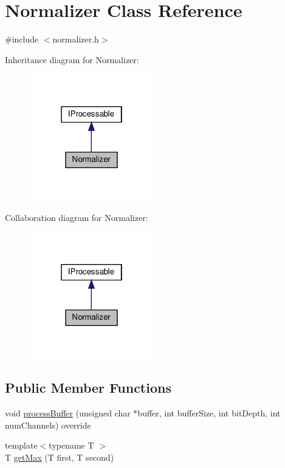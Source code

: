 \hypertarget{classNormalizer}{}\section{Normalizer Class Reference}
\label{classNormalizer}


{\ttfamily \#include $<$normalizer.\+h$>$}



Inheritance diagram for Normalizer\+:
\nopagebreak
\begin{figure}[H]
\begin{center}
\leavevmode
\includegraphics[width=154pt]{dd/d2d/classNormalizer__inherit__graph}
\end{center}
\end{figure}


Collaboration diagram for Normalizer\+:
\nopagebreak
\begin{figure}[H]
\begin{center}
\leavevmode
\includegraphics[width=154pt]{d9/da8/classNormalizer__coll__graph}
\end{center}
\end{figure}
\subsection*{Public Member Functions}
\begin{DoxyCompactItemize}
\item 
void \hyperlink{classNormalizer_ab17632635876ca5cf6da795525889761}{process\+Buffer} (unsigned char $\ast$buffer, int buffer\+Size, int bit\+Depth, int num\+Channels) override
\item 
{\footnotesize template$<$typename T $>$ }\\T \hyperlink{classNormalizer_a032dc937c5feeb167e5095f624434637}{get\+Max} (T first, T second)
\end{DoxyCompactItemize}


